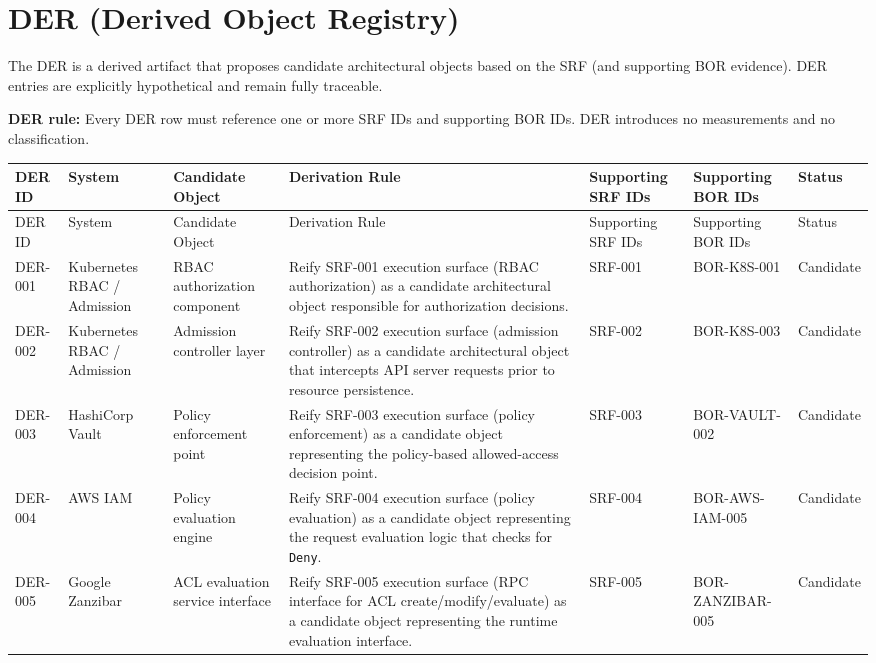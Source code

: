 \documentclass{article}
\begin{document}
\newpage
\section*{DER (Derived Object Registry)}

The DER is a derived artifact that proposes candidate architectural objects based on the SRF (and supporting BOR evidence). DER entries are explicitly hypothetical and remain fully traceable.

\noindent\textbf{DER rule:} Every DER row must reference one or more SRF IDs and supporting BOR IDs. DER introduces no measurements and no classification.

\begin{longtable}{@{}p{}p{}p{}p{}p{}p{}p{}@{}}
\toprule
DER ID & System & Candidate Object & Derivation Rule & Supporting SRF IDs & Supporting BOR IDs & Status\\
\midrule
\endfirsthead
\toprule
DER ID & System & Candidate Object & Derivation Rule & Supporting SRF IDs & Supporting BOR IDs & Status\\
\midrule
\endhead
DER-001 & Kubernetes RBAC / Admission & RBAC authorization component & Reify SRF-001 execution surface (RBAC authorization) as a candidate architectural object responsible for authorization decisions. & SRF-001 & BOR-K8S-001 & Candidate\\
DER-002 & Kubernetes RBAC / Admission & Admission controller layer & Reify SRF-002 execution surface (admission controller) as a candidate architectural object that intercepts API server requests prior to resource persistence. & SRF-002 & BOR-K8S-003 & Candidate\\
DER-003 & HashiCorp Vault & Policy enforcement point & Reify SRF-003 execution surface (policy enforcement) as a candidate object representing the policy-based allowed-access decision point. & SRF-003 & BOR-VAULT-002 & Candidate\\
DER-004 & AWS IAM & Policy evaluation engine & Reify SRF-004 execution surface (policy evaluation) as a candidate object representing the request evaluation logic that checks for \texttt{Deny}. & SRF-004 & BOR-AWS-IAM-005 & Candidate\\
DER-005 & Google Zanzibar & ACL evaluation service interface & Reify SRF-005 execution surface (RPC interface for ACL create/modify/evaluate) as a candidate object representing the runtime evaluation interface. & SRF-005 & BOR-ZANZIBAR-005 & Candidate\\

\end{longtable}
\end{document}
